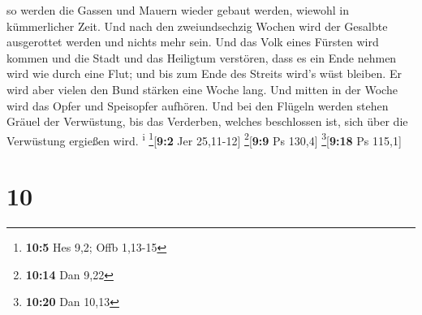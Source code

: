 so werden die Gassen und Mauern wieder gebaut werden, wiewohl in
kümmerlicher Zeit.  Und nach den zweiundsechzig Wochen
wird der Gesalbte ausgerottet werden und nichts mehr sein. Und das Volk
eines Fürsten wird kommen und die Stadt und das Heiligtum verstören,
dass es ein Ende nehmen wird wie durch eine Flut; und bis zum Ende des
Streits wird's wüst bleiben.  Er wird aber vielen den
Bund stärken eine Woche lang. Und mitten in der Woche wird das Opfer und
Speisopfer aufhören. Und bei den Flügeln werden stehen Gräuel der
Verwüstung, bis das Verderben, welches beschlossen ist, sich über die
Verwüstung ergießen wird. \textsuperscript{i} \footnote{\textbf{10:5}
  Hes 9,2; Offb 1,13-15}{[}\textbf{9:2} Jer 25,11-12{]}
\footnote{\textbf{10:14} Dan 9,22}{[}\textbf{9:9} Ps 130,4{]}
\footnote{\textbf{10:20} Dan 10,13}{[}\textbf{9:18} Ps 115,1{]}

\hypertarget{section-9}{%
\section{10}\label{section-9}}


